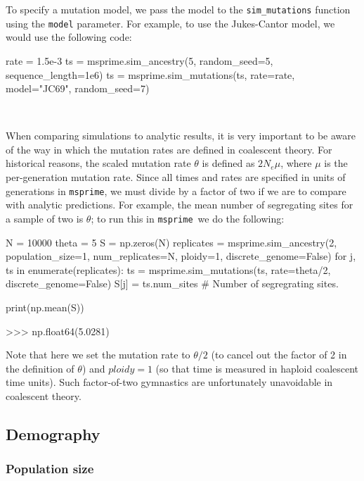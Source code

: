 \documentclass[graybox]{svmult}
\newcommand{\msprime}[0]{\texttt{msprime}}
\begin{document}
To specify a mutation model, we pass the model to the \texttt{sim\_mutations} function using the \texttt{model} parameter. For example,
to use the Jukes-Cantor model, we would use the following code:

\begin{pythoncode}
rate = 1.5e-3
ts = msprime.sim_ancestry(5, random_seed=5, sequence_length=1e6)
ts = msprime.sim_mutations(ts, rate=rate, model="JC69", random_seed=7)
\end{pythoncode}

 \

When comparing simulations to analytic results, it is very important to be aware of the way in which the
mutation rates are defined in coalescent theory. For historical reasons,
the scaled mutation rate \(\theta\) is defined as \(2N_e \mu\), where
\(\mu\) is the per-generation mutation rate. Since all times and rates
are specified in units of generations in \msprime, we must divide by a
factor of two if we are to compare with analytic predictions. For
example, the mean number of segregating sites for a sample of two is
\(\theta\); to run this in \msprime\ we do the following:

\begin{pythoncode}
N = 10000
theta = 5
S = np.zeros(N)
replicates = msprime.sim_ancestry(2, population_size=1,
                                  num_replicates=N,
                                  ploidy=1,
                                  discrete_genome=False)
for j, ts in enumerate(replicates):
    ts = msprime.sim_mutations(ts, rate=theta/2,
                               discrete_genome=False)
    S[j] = ts.num_sites  # Number of segregrating sites.

print(np.mean(S))

>>> np.float64(5.0281)

\end{pythoncode}

    Note that here we set the mutation rate to \(\theta / 2\) (to cancel out
the factor of 2 in the definition of \(\theta\)) and \(ploidy = 1\) (so
that time is measured in haploid coalescent time units). Such
factor-of-two gymnastics are unfortunately unavoidable in coalescent
theory.

\subsection{Demography}\label{Demography}

\subsubsection{Population size}\label{population-models}
\end{document}
